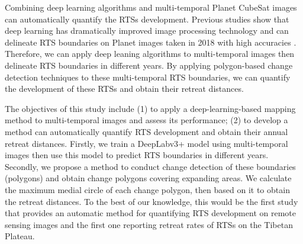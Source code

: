 \documentclass[authoryear,preprint,review,12pt]{elsarticle}
\begin{document}
Combining deep learning algorithms and multi-temporal Planet CubeSat images can automatically quantify the RTSs development.
Previous studies show that deep learning has dramatically improved image processing technology \citep{leCun2015Deep} and can delineate RTS boundaries on Planet images taken in 2018 with high accuracies \citep{huang2020using}. 
Therefore, we can apply deep leaning algorithms to multi-temporal images then delineate RTS boundaries in different years.
By applying polygon-based change detection techniques to these multi-temporal RTS boundaries, we can quantify the development of these RTSs and obtain their retreat distances. 


The objectives of this study include (1) to apply a deep-learning-based mapping method to multi-temporal images and assess its performance; (2) to develop a method can automatically quantify RTS development 
and obtain their annual retreat distances.
Firstly, we train a DeepLabv3+ model using multi-temporal images then use this model to predict RTS boundaries in different years.
Secondly, we propose a method to conduct change detection of these boundaries (polygons)  and obtain change polygons covering expanding areas.  
We calculate the maximum medial circle of each change polygon, then based on it to obtain the retreat distances.  
To the best of our knowledge, this would be the first study that provides an automatic method for quantifying RTS development on remote sensing images and the first one reporting retreat rates of RTSs on the Tibetan Plateau. 

\end{document}
